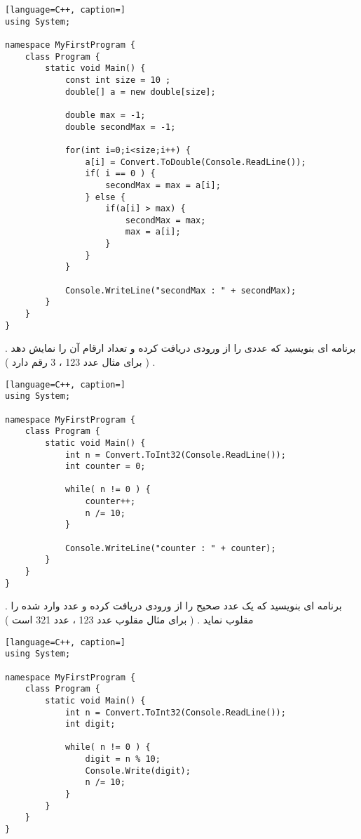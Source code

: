 \documentclass[12pt]{article}
\begin{document}
\begin{latin}
\begin{lstlisting}[language=C++, caption=]
using System;

namespace MyFirstProgram {
	class Program {
		static void Main() {
			const int size = 10 ;
			double[] a = new double[size];
			
			double max = -1; 
			double secondMax = -1;
			
			for(int i=0;i<size;i++) {
				a[i] = Convert.ToDouble(Console.ReadLine());
				if( i == 0 ) {
					secondMax = max = a[i];
				} else {
					if(a[i] > max) {
						secondMax = max;
						max = a[i];
					}
				}
			}
	
			Console.WriteLine("secondMax : " + secondMax);
		}
	}
}
\end{lstlisting}
\end{latin}







\newpage

 . برنامه ای بنویسید که عددی را از ورودی دریافت کرده و تعداد ارقام آن را نمایش دهد . ( برای مثال عدد 123 ، 3 رقم دارد )






\begin{latin}
\begin{lstlisting}[language=C++, caption=]
using System;

namespace MyFirstProgram {
	class Program {
		static void Main() {
			int n = Convert.ToInt32(Console.ReadLine());
			int counter = 0;
			
			while( n != 0 ) {
				counter++;
				n /= 10;
			}
			
			Console.WriteLine("counter : " + counter);
		}
	}
}
\end{lstlisting}
\end{latin}








\newpage

 . برنامه ای بنویسید که یک عدد صحیح را از ورودی دریافت کرده و عدد وارد شده را مقلوب نماید . ( برای مثال مقلوب عدد 123 ، عدد 321 است )






\begin{latin}
\begin{lstlisting}[language=C++, caption=]
using System;

namespace MyFirstProgram {
	class Program {
		static void Main() {
			int n = Convert.ToInt32(Console.ReadLine());
			int digit;
			
			while( n != 0 ) {
				digit = n % 10;
				Console.Write(digit);
				n /= 10;
			}
		}
	}
}
\end{lstlisting}
\end{latin}
\end{document}
